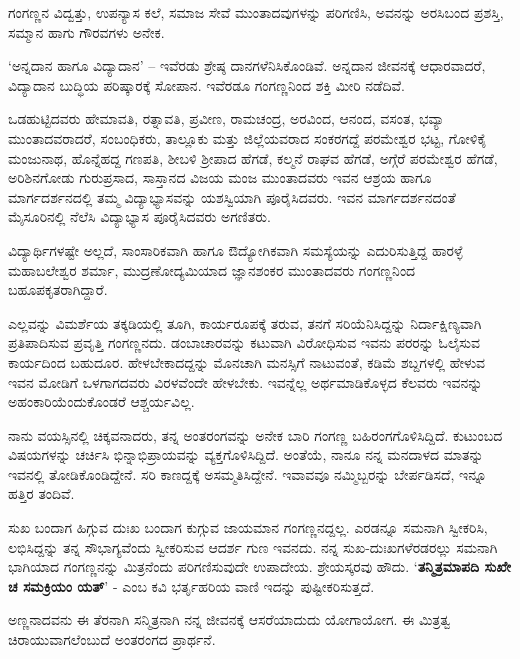 ಗಂಗಣ್ಣನ ವಿದ್ವತ್ತು, ಉಪನ್ಯಾಸ ಕಲೆ, ಸಮಾಜ ಸೇವೆ ಮುಂತಾದವುಗಳನ್ನು ಪರಿಗಣಿಸಿ, ಅವನನ್ನು ಅರಸಿಬಂದ ಪ್ರಶಸ್ತಿ, ಸಮ್ಮಾನ ಹಾಗು ಗೌರವಗಳು ಅನೇಕ.

‘ಅನ್ನದಾನ ಹಾಗೂ ವಿದ್ಯಾದಾನ’ – ಇವೆರಡು ಶ್ರೇಷ್ಠ ದಾನಗಳೆನಿಸಿಕೊಂಡಿವೆ. ಅನ್ನದಾನ ಜೀವನಕ್ಕೆ ಆಧಾರವಾದರೆ, ವಿದ್ಯಾದಾನ ಬುದ್ಧಿಯ ಪರಿಷ್ಕಾರಕ್ಕೆ ಸೋಪಾನ. ಇವೆರಡೂ ಗಂಗಣ್ಣನಿಂದ ಶಕ್ತಿ ಮೀರಿ ನಡೆದಿವೆ. 

ಒಡಹುಟ್ಟಿದವರು ಹೇಮಾವತಿ, ರತ್ನಾವತಿ, ಪ್ರವೀಣ, ರಾಮಚಂದ್ರ, ಅರವಿಂದ, ಆನಂದ, ವಸಂತ, ಭವ್ಯಾ ಮುಂತಾದವರಾದರೆ, ಸಂಬಂಧಿಕರು, ತಾಲ್ಲೂಕು ಮತ್ತು ಜಿಲ್ಲೆಯವರಾದ ಸಂಕರಗದ್ದೆ ಪರಮೇಶ್ವರ ಭಟ್ಟ, ಗೋಳಿಕೈ ಮಂಜುನಾಥ, ಹೊನ್ನೆಹದ್ದ ಗಣಪತಿ, ಶೀಬಳಿ ಶ್ರೀಪಾದ ಹೆಗಡೆ, ಕಲ್ಮನೆ ರಾಘವ ಹೆಗಡೆ, ಅಗ್ಗೆರೆ ಪರಮೇಶ್ವರ ಹೆಗಡೆ, ಅರಿಶಿನಗೋಡು ಗುರುಪ್ರಸಾದ, ಸಾಸ್ತಾನದ ವಿಜಯ ಮಂಜ ಮುಂತಾದವರು ಇವನ ಆಶ್ರಯ ಹಾಗೂ ಮಾರ್ಗದರ್ಶನದಲ್ಲಿ ತಮ್ಮ ವಿದ್ಯಾಭ್ಯಾಸವನ್ನು ಯಶಸ್ವಿಯಾಗಿ ಪೂರೈಸಿದವರು. ಇವನ ಮಾರ್ಗದರ್ಶನದಂತೆ ಮೈಸೂರಿನಲ್ಲಿ ನೆಲೆಸಿ ವಿದ್ಯಾಭ್ಯಾಸ ಪೂರೈಸಿದವರು ಅಗಣಿತರು.

ವಿದ್ಯಾರ್ಥಿಗಳಷ್ಟೇ ಅಲ್ಲದೆ, ಸಾಂಸಾರಿಕವಾಗಿ ಹಾಗೂ ಔದ್ಯೋಗಿಕವಾಗಿ ಸಮಸ್ಯೆಯನ್ನು ಎದುರಿಸುತ್ತಿದ್ದ ಹಾರಳ್ಳೆ ಮಹಾಬಲೇಶ್ವರ ಶರ್ಮಾ, ಮುದ್ರಣೋದ್ಯಮಿಯಾದ ಜ್ಞಾನಶಂಕರ ಮುಂತಾದವರು ಗಂಗಣ್ಣನಿಂದ ಬಹೂಪಕೃತರಾಗಿದ್ದಾರೆ.

ಎಲ್ಲವನ್ನು ವಿಮರ್ಶೆಯ ತಕ್ಕಡಿಯಲ್ಲಿ ತೂಗಿ, ಕಾರ್ಯರೂಪಕ್ಕೆ ತರುವ, ತನಗೆ ಸರಿಯೆನಿಸಿದ್ದನ್ನು ನಿರ್ದಾಕ್ಷಿಣ್ಯವಾಗಿ ಪ್ರತಿಪಾದಿಸುವ ಪ್ರವೃತ್ತಿ ಗಂಗಣ್ಣನದು. ಡಂಬಾಚಾರವನ್ನು ಕಟುವಾಗಿ ವಿರೋಧಿಸುವ ಇವನು ಪರರನ್ನು ಓಲೈಸುವ ಕಾರ್ಯದಿಂದ ಬಹುದೂರ. ಹೇಳಬೇಕಾದದ್ದನ್ನು ಮೊನಚಾಗಿ ಮನಸ್ಸಿಗೆ ನಾಟುವಂತೆ, ಕಡಿಮೆ ಶಬ್ದಗಳಲ್ಲಿ ಹೇಳುವ ಇವನ ಮೋಡಿಗೆ ಒಳಗಾಗದವರು ವಿರಳವೆಂದೇ ಹೇಳಬೇಕು. ಇವನ್ನೆಲ್ಲ ಅರ್ಥಮಾಡಿಕೊಳ್ಳದ ಕೆಲವರು ಇವನನ್ನು ಅಹಂಕಾರಿಯೆಂದುಕೊಂಡರೆ ಆಶ್ಚರ್ಯವಿಲ್ಲ.

ನಾನು ವಯಸ್ಸಿನಲ್ಲಿ ಚಿಕ್ಕವನಾದರು, ತನ್ನ ಅಂತರಂಗವನ್ನು ಅನೇಕ ಬಾರಿ ಗಂಗಣ್ಣ ಬಹಿರಂಗಗೊಳಿಸಿದ್ದಿದೆ. ಕುಟುಂಬದ ವಿಷಯಗಳನ್ನು ಚರ್ಚಿಸಿ ಭಿನ್ನಾಭಿಪ್ರಾಯವನ್ನು ವ್ಯಕ್ತಗೊಳಿಸಿದ್ದಿದೆ. ಅಂತೆಯೆ, ನಾನೂ ನನ್ನ ಮನದಾಳದ ಮಾತನ್ನು ಇವನಲ್ಲಿ ತೋಡಿಕೊಂಡಿದ್ದೇನೆ. ಸರಿ ಕಾಣದ್ದಕ್ಕೆ ಅಸಮ್ಮತಿಸಿದ್ದೇನೆ. ಇವಾವವೂ ನಮ್ಮಿಬ್ಬರನ್ನು ಬೇರ್ಪಡಿಸದೆ, ಇನ್ನೂ ಹತ್ತಿರ ತಂದಿವೆ.

ಸುಖ ಬಂದಾಗ ಹಿಗ್ಗುವ ದುಃಖ ಬಂದಾಗ ಕುಗ್ಗುವ ಜಾಯಮಾನ ಗಂಗಣ್ಣನದ್ದಲ್ಲ. ಎರಡನ್ನೂ ಸಮನಾಗಿ ಸ್ವೀಕರಿಸಿ, ಲಭಿಸಿದ್ದನ್ನು ತನ್ನ ಸೌಭಾಗ್ಯವೆಂದು ಸ್ವೀಕರಿಸುವ ಆದರ್ಶ ಗುಣ ಇವನದು. ನನ್ನ ಸುಖ-ದುಃಖಗಳೆರಡರಲ್ಲು ಸಮನಾಗಿ ಭಾಗಿಯಾದ ಗಂಗಣ್ಣನನ್ನು ಮಿತ್ರನೆಂದು ಪರಿಗಣಿಸುವುದೇ ಉಪಾದೇಯ. ಶ್ರೇಯಸ್ಕರವು ಹೌದು. ‘\textbf{ತನ್ಮಿತ್ರಮಾಪದಿ ಸುಖೇ ಚ ಸಮಕ್ರಿಯಂ ಯತ್}’ - ಎಂಬ ಕವಿ ಭರ್ತೃಹರಿಯ ವಾಣಿ ಇದನ್ನು ಪುಷ್ಟೀಕರಿಸುತ್ತದೆ.

ಅಣ್ಣನಾದವನು ಈ ತೆರನಾಗಿ ಸನ್ಮಿತ್ರನಾಗಿ ನನ್ನ ಜೀವನಕ್ಕೆ ಆಸರೆಯಾದುದು ಯೋಗಾಯೋಗ. ಈ ಮಿತ್ರತ್ವ ಚಿರಾಯುವಾಗಲೆಂಬುದೆ ಅಂತರಂಗದ ಪ್ರಾರ್ಥನೆ.

